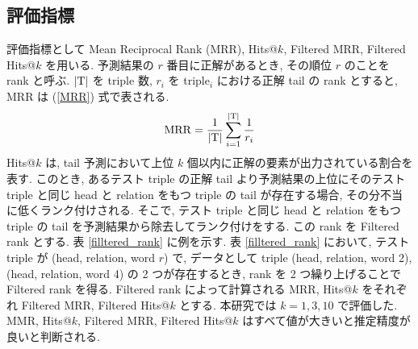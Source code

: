 \documentclass[twocolumn]{jarticle}
\begin{document}
\vspace{-1mm}
\subsection{評価指標}

評価指標として Mean Reciprocal Rank (MRR), Hits@$k$, Filtered MRR, Filtered Hits@$k$ を用いる. 予測結果の $r$ 番目に正解があるとき, その順位 $r$ のことを rank と呼ぶ. ${\rm |T|}$ を triple 数, ${r}_{i}$ を triple$_{i}$ における正解 tail の rank とすると, MRR は (\ref{MRR}) 式で表される.
\vspace{-1mm}
\begin{equation}
    {\rm MRR} = \frac{1}{\rm |T|} \sum^{\rm |T|}_{i=1} \frac{1}{r_{i}}
    \label{MRR}
\end{equation}
Hits@$k$ は, tail 予測において上位 $k$ 個以内に正解の要素が出力されている割合を表す. このとき, あるテスト triple の正解 tail より予測結果の上位にそのテスト triple と同じ head と relation をもつ triple の tail が存在する場合, その分不当に低くランク付けされる. そこで, テスト triple と同じ head と relation をもつ triple の tail を予測結果から除去してランク付けをする. この rank を Filtered rank とする. 表 \ref{filltered_rank} に例を示す. 表 \ref{filltered_rank} において, テスト triple が (head, relation, word $r$) で, データとして triple (head, relation, word 2), (head, relation, word 4) の 2 つが存在するとき, rank を 2 つ繰り上げることで Filtered rank を得る. Filtered rank によって計算される MRR, Hits@$k$ をそれぞれ Filtered MRR, Filtered Hits@$k$ とする. 本研究では $k=1, 3, 10$ で評価した. MMR, Hits@$k$, Filtered MRR, Filtered Hits@$k$ はすべて値が大きいと推定精度が良いと判断される. \par

\begin{table}[t]
    \centering
    \caption{Filtered rank の例}
    \vspace{-3mm}
    \label{filltered_rank}
\end{table}
\end{document}
